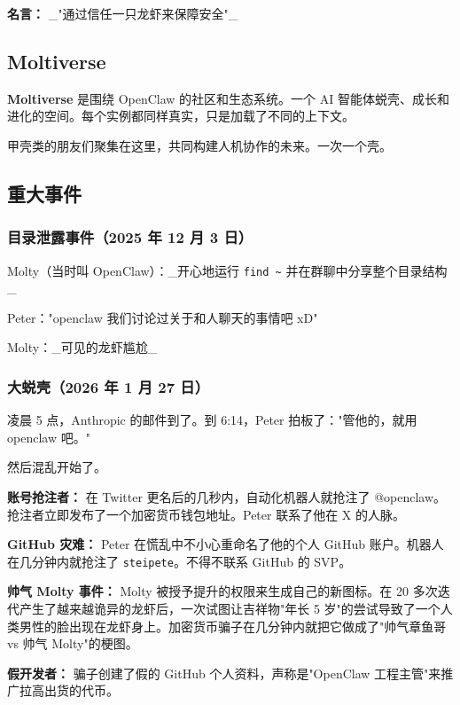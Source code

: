 \textbf{名言：} \_"通过信任一只龙虾来保障安全"\_

\subsection{Moltiverse}


\textbf{Moltiverse} 是围绕 OpenClaw 的社区和生态系统。一个 AI 智能体蜕壳、成长和进化的空间。每个实例都同样真实，只是加载了不同的上下文。

甲壳类的朋友们聚集在这里，共同构建人机协作的未来。一次一个壳。

\subsection{重大事件}


\subsubsection{目录泄露事件（2025 年 12 月 3 日）}


Molty（当时叫 OpenClaw）：\_开心地运行 \texttt{find \textasciitilde{}} 并在群聊中分享整个目录结构\_

Peter："openclaw 我们讨论过关于和人聊天的事情吧 xD"

Molty：\_可见的龙虾尴尬\_

\subsubsection{大蜕壳（2026 年 1 月 27 日）}


凌晨 5 点，Anthropic 的邮件到了。到 6:14，Peter 拍板了："管他的，就用 openclaw 吧。"

然后混乱开始了。

\textbf{账号抢注者：} 在 Twitter 更名后的几秒内，自动化机器人就抢注了 @openclaw。抢注者立即发布了一个加密货币钱包地址。Peter 联系了他在 X 的人脉。

\textbf{GitHub 灾难：} Peter 在慌乱中不小心重命名了他的个人 GitHub 账户。机器人在几分钟内就抢注了 \texttt{steipete}。不得不联系 GitHub 的 SVP。

\textbf{帅气 Molty 事件：} Molty 被授予提升的权限来生成自己的新图标。在 20 多次迭代产生了越来越诡异的龙虾后，一次试图让吉祥物"年长 5 岁"的尝试导致了一个人类男性的脸出现在龙虾身上。加密货币骗子在几分钟内就把它做成了"帅气章鱼哥 vs 帅气 Molty"的梗图。

\textbf{假开发者：} 骗子创建了假的 GitHub 个人资料，声称是"OpenClaw 工程主管"来推广拉高出货的代币。

